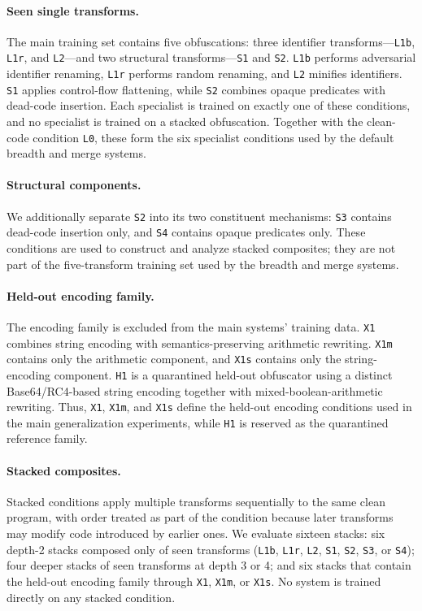 \paragraph{Seen single transforms.}
The main training set contains five obfuscations:
three identifier transforms---\texttt{L1b}, \texttt{L1r}, and \texttt{L2}---and
two structural transforms---\texttt{S1} and \texttt{S2}.
\texttt{L1b} performs adversarial identifier renaming, \texttt{L1r} performs
random renaming, and \texttt{L2} minifies identifiers.
\texttt{S1} applies control-flow flattening, while \texttt{S2} combines opaque
predicates with dead-code insertion.
Each specialist is trained on exactly one of these conditions, and no specialist
is trained on a stacked obfuscation. Together with the clean-code
condition \texttt{L0}, these form the six specialist conditions used by the
default breadth and merge systems.

\paragraph{Structural components.}
We additionally separate \texttt{S2} into its two constituent mechanisms:
\texttt{S3} contains dead-code insertion only, and \texttt{S4} contains opaque
predicates only. These conditions are used to construct and analyze stacked
composites; they are not part of the five-transform training set used by the
breadth and merge systems.

\paragraph{Held-out encoding family.}
The encoding family is excluded from the main systems' training data.
\texttt{X1} combines string encoding with semantics-preserving arithmetic
rewriting. \texttt{X1m} contains only the arithmetic component, and
\texttt{X1s} contains only the string-encoding component.
\texttt{H1} is a quarantined held-out obfuscator using a distinct
Base64/RC4-based string encoding together with mixed-boolean-arithmetic
rewriting. Thus, \texttt{X1}, \texttt{X1m}, and \texttt{X1s} define the
held-out encoding conditions used in the main generalization experiments,
while \texttt{H1} is reserved as the quarantined reference family.

\paragraph{Stacked composites.}
Stacked conditions apply multiple transforms sequentially to the same clean
program, with order treated as part of the condition because later transforms
may modify code introduced by earlier ones. We evaluate sixteen stacks:
six depth-2 stacks composed only of seen transforms
(\texttt{L1b}, \texttt{L1r}, \texttt{L2}, \texttt{S1}, \texttt{S2},
\texttt{S3}, or \texttt{S4});
four deeper stacks of seen transforms at depth 3 or 4; and six stacks that
contain the held-out encoding family through \texttt{X1}, \texttt{X1m}, or
\texttt{X1s}. No system is trained directly on any stacked condition.


